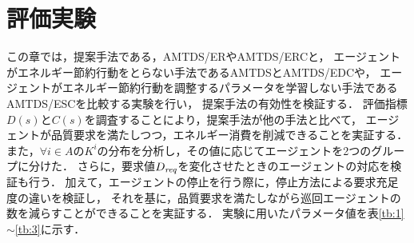 \documentclass[12pt,a4j,twoside]{jarticle}
\def\AgentSet{A}
\def\Dreq{{D_{\it req}}}
\begin{document}
  
  \section{評価実験}
  この章では，提案手法である，AMTDS/ERやAMTDS/ERCと，
  エージェントがエネルギー節約行動をとらない手法であるAMTDS\cite{Yoneda2013}とAMTDS/EDC\cite{Sugiyama2019}や，
  エージェントがエネルギー節約行動を調整するパラメータを学習しない手法であるAMTDS/ESC\cite{Wu2019}を比較する実験を行い，
  提案手法の有効性を検証する．
  評価指標$D(s)$と$C(s)$を調査することにより，提案手法が他の手法と比べて，
  エージェントが品質要求を満たしつつ，エネルギー消費を削減できることを実証する．
  また，$\forall i\in\AgentSet$の$K^i$の分布を分析し，その値に応じてエージェントを2つのグループに分けた．
  さらに，要求値$\Dreq$を変化させたときのエージェントの対応を検証も行う．
  加えて，エージェントの停止を行う際に，停止方法による要求充足度の違いを検証し，
  それを基に，品質要求を満たしながら巡回エージェントの数を減らすことができることを実証する．
  実験に用いたパラメータ値を表\ref{tb:1}$\sim$\ref{tb:3}に示す．
\end{document}
